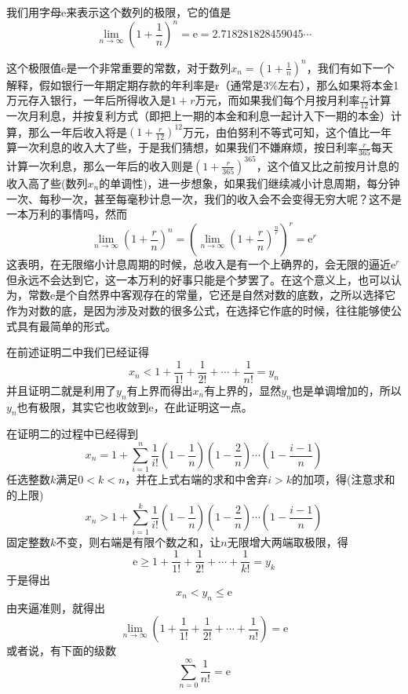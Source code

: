 我们用字母$\mathrm{e}$来表示这个数列的极限，它的值是
\[ \lim_{n \to \infty} \left( 1+\frac{1}{n} \right)^n = \mathrm{e}= 2.718281828459045\cdots \]

\begin{example}
  这个极限值$\mathrm{e}$是一个非常重要的常数，对于数列$x_n=\left( 1+\frac{1}{n} \right)^n$，我们有如下一个解释，假如银行一年期定期存款的年利率是r（通常是3\%左右），那么如果将本金1万元存入银行，一年后所得收入是$1+r$万元，而如果我们每个月按月利率$\frac{r}{12}$计算一次月利息，并按复利方式（即把上一期的本金和利息一起计入下一期的本金）计算，那么一年后收入将是$\left( 1+\frac{r}{12} \right)^{12}$万元，由伯努利不等式可知，这个值比一年算一次利息的收入大了些，于是我们猜想，如果我们不嫌麻烦，按日利率$\frac{r}{365}$每天计算一次利息，那么一年后的收入则是$\left( 1+\frac{r}{365} \right)^{365}$，这个值又比之前按月计息的收入高了些(数列$x_n$的单调性)，进一步想象，如果我们继续减小计息周期，每分钟一次、每秒一次，甚至每毫秒计息一次，我们的收入会不会变得无穷大呢？这不是一本万利的事情吗，然而
  \[ \lim_{n \to \infty} \left( 1+\frac{r}{n} \right)^n = \left( \lim_{n \to \infty} \left( 1+\frac{r}{n} \right)^{\frac{n}{r}} \right)^r = \mathrm{e}^r \]
  这表明，在无限缩小计息周期的时候，总收入是有一个上确界的，会无限的逼近$\mathrm{e}^r$但永远不会达到它，这一本万利的好事只能是个梦罢了。在这个意义上，也可以认为，常数$\mathrm{e}$是个自然界中客观存在的常量，它还是自然对数的底数，之所以选择它作为对数的底，是因为涉及对数的很多公式，在选择它作底的时候，往往能够使公式具有最简单的形式。
\end{example}

在前述证明二中我们已经证得
\[ x_n < 1 + \frac{1}{1!} + \frac{1}{2!} + \cdots + \frac{1}{n!} = y_n \]
并且证明二就是利用了$y_n$有上界而得出$x_n$有上界的，显然$y_n$也是单调增加的，所以$y_n$也有极限，其实它也收敛到$\mathrm{e}$，在此证明这一点。

在证明二的过程中已经得到
\[ x_n = 1 + \sum_{i=1}^n \frac{1}{i!}\left( 1-\frac{1}{n} \right) \left( 1-\frac{2}{n} \right) \cdots \left( 1-\frac{i-1}{n} \right) \]
任选整数$k$满足$0<k<n$，并在上式右端的求和中舍弃$i>k$的加项，得(注意求和的上限)
\begin{equation}\label{eq:e-xn-yk}
 x_n > 1 + \sum_{i=1}^k \frac{1}{i!}\left( 1-\frac{1}{n} \right) \left( 1-\frac{2}{n} \right) \cdots \left( 1-\frac{i-1}{n} \right) 
\end{equation}
固定整数$k$不变，则右端是有限个数之和，让$n$无限增大两端取极限，得
\[ \mathrm{e} \geqslant 1 + \frac{1}{1!} + \frac{1}{2!} + \cdots + \frac{1}{k!} = y_k \]
于是得出
\[ x_n < y_n \leqslant \mathrm{e} \]
由夹逼准则，就得出
\[ \lim_{n \to \infty} \left( 1 + \frac{1}{1!} + \frac{1}{2!} + \cdots + \frac{1}{n!} \right) = \mathrm{e} \]
或者说，有下面的级数
\begin{equation}
  \label{eq:series-1-devide-by-n-fractor-is-e}
 \sum_{n=0}^{\infty} \frac{1}{n!} = \mathrm{e} 
\end{equation}

